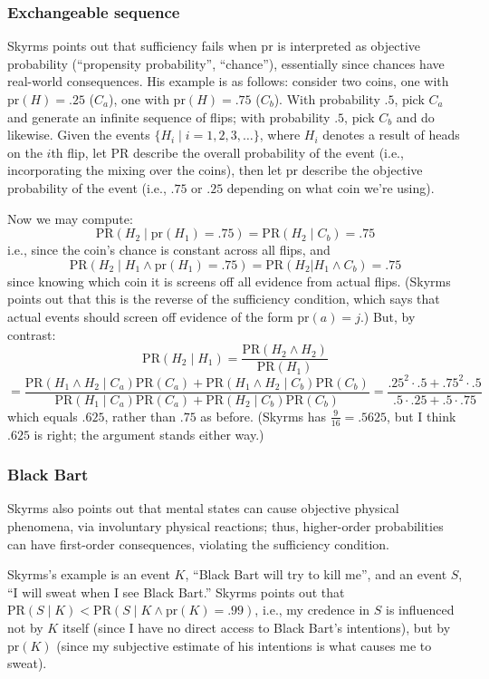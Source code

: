 \documentclass[letterpaper,12pt]{article}
\begin{document}
\subsubsection{Exchangeable sequence}
Skyrms points out that sufficiency fails when $\text{pr}$ is interpreted as objective probability (``propensity probability'', ``chance''), essentially since chances have real-world consequences. His example is as follows: consider two coins, one with $\text{pr}(H) = .25$ ($C_a$), one with $\text{pr}(H) = .75$ ($C_b$). With probability $.5$, pick $C_a$ and generate an infinite sequence of flips; with probability $.5$, pick $C_b$ and do likewise. Given the events $\{H_i \mid i = 1, 2, 3, \ldots\}$, where $H_i$ denotes a result of heads on the $i$th flip, let $\text{PR}$ describe the overall probability of the event (i.e., incorporating the mixing over the coins), then let $\text{pr}$ describe the objective probability of the event (i.e., $.75$ or $.25$ depending on what coin we're using).

Now we may compute:
$$\text{PR}(H_2 \mid \text{pr}(H_1) = .75) = \text{PR}(H_2 \mid C_b) = .75$$
i.e., since the coin's chance is constant across all flips, and
$$\text{PR}(H_2 \mid H_1 \land \text{pr}(H_1) = .75) = \text{PR}(H_2 | H_1 \land C_b) = .75$$
since knowing which coin it is screens off all evidence from actual flips. (Skyrms points out that this is the reverse of the sufficiency condition, which says that actual events should screen off evidence of the form $\text{pr}(a) = j$.) But, by contrast:
$$\text{PR}(H_2 \mid H_1) = \frac{\text{PR}(H_2 \land H_2)}{\text{PR}(H_1)}$$
$$= \frac{\text{PR}(H_1 \land H_2 \mid C_a)\text{PR}(C_a) + \text{PR}(H_1 \land H_2 \mid C_b)\text{PR}(C_b)}{\text{PR}(H_1 \mid C_a)\text{PR}(C_a) + \text{PR}(H_2 \mid C_b)\text{PR}(C_b)} = \frac{.25^2 \cdot .5 + .75^2 \cdot .5}{.5 \cdot .25 + .5 \cdot .75}$$
which equals $.625$, rather than $.75$ as before. (Skyrms has $\frac{9}{16} = .5625$, but I think $.625$ is right; the argument stands either way.)

\subsubsection{Black Bart}
Skyrms also points out that mental states can cause objective physical phenomena, via involuntary physical reactions; thus, higher-order probabilities can have first-order consequences, violating the sufficiency condition.

Skyrms's example is an event $K$, ``Black Bart will try to kill me'', and an event $S$, ``I will sweat when I see Black Bart.'' Skyrms points out that $\text{PR}(S \mid K) < \text{PR}(S \mid K \land \text{pr}(K) = .99)$, i.e., my credence in $S$ is influenced not by $K$ itself (since I have no direct access to Black Bart's intentions), but by $\text{pr}(K)$ (since my subjective estimate of his intentions is what causes me to sweat).
\end{document}
